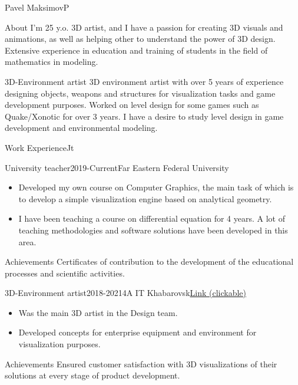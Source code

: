 \documentclass[10pt]{extarticle}
\begin{document}
	\begin{centralpart}{Pavel Maksimov}{P}{}
		\begin{titleblock}{About}{}{}{}
			I'm 25 y.o. 3D artist, and I have a passion for creating 3D visuals and animations, as well as helping other to understand the power of 3D design. Extensive experience in education and training of students in the field of mathematics in modeling.
		\end{titleblock}

		\begin{titleblock}{3D-Environment artist}{}{}{}
			3D environment artist with over 5 years of experience designing objects, weapons and structures for visualization tasks and game development purposes. Worked on level design for some games such as Quake/Xonotic for over 3 years. I have a desire to study level design in game development and environmental modeling.
		\end{titleblock}
	\end{centralpart}

	\UpdatePosition
	
	\begin{centralpart}{Work Experience}{J}{t}
		\begin{titleblock}{University teacher}{2019-Current}{Far Eastern Federal University}{}
			\begin{itemize}[label=$\circ$]
				\item Developed my own course on Computer Graphics, the main task of which is to develop a simple visualization engine based on analytical geometry.
				\item I have been teaching a course on differential equation for 4 years. A lot of teaching methodologies and software solutions have been developed in this area.
			\end{itemize}
		\end{titleblock}
		\begin{additionalblock}{Achievements}
			Certificates of contribution to the development of the educational processes and scientific activities.
		\end{additionalblock}
		\begin{titleblock}{3D-Environment artist}{2018-2021}{4A IT Khabarovsk}{\href{https://4ait.ru/}{Link (clickable)}}
			\begin{itemize}[label=$\circ$]
				\item Was the main 3D artist in the Design team.
				\item Developed concepts for enterprise equipment and environment for visualization purposes.
			\end{itemize}
		\end{titleblock}
		\begin{additionalblock}{Achievements}
			Ensured customer satisfaction with 3D visualizations of their solutions at every stage of product development.
		\end{additionalblock}
	\end{centralpart}
\end{document}
